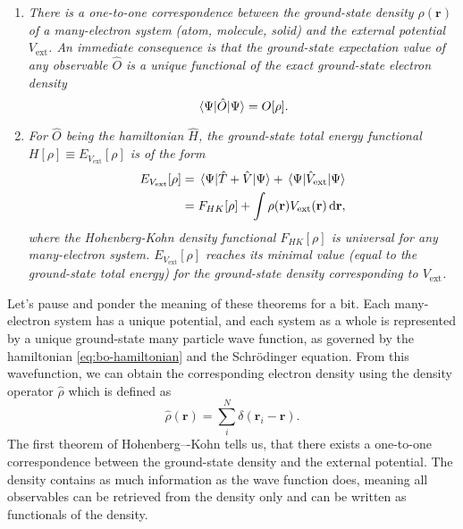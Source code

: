 \begin{enumerate}
  \item \textit{There is a one-to-one correspondence between the ground-state
  density $\rho(\mathbf{r})$ of a many-electron system (atom, molecule, solid)
  and the external potential $V_\mathrm{ext}$. An immediate consequence is
  that the ground-state expectation value of any observable $\hat O$ is a
  unique functional of the exact ground-state electron density}
  \begin{equation}
    \mel{\Psi}{\hat O}{\Psi} = O[\rho].
  \end{equation}

  \item \textit{For $\hat O$ being the hamiltonian $\hat H$, the ground-state
  total energy functional $H[\rho] \equiv E_{V_\mathrm{ext}}[\rho]$ is of the
  form}
  \begin{equation}
  \begin{alignedat}{2}
    E_{V_\mathrm{ext}}[\rho]
    &= \mel{\Psi}{\hat T + \hat V}{\Psi}
    + \mel{\Psi}{\hat V_\mathrm{ext}}{\Psi} \\
    &= F_{HK}[\rho] +
    \int \rho(\mathbf{r}) V_\mathrm{ext}(\mathbf{r}) \, \mathrm{d}\mathbf{r},
    \label{eq:hk-2}
  \end{alignedat}
  \end{equation}
  \textit{where the Hohenberg-Kohn density functional $F_{HK}[\rho]$ is
  universal for any many-electron system. $E_{V_\mathrm{ext}}[\rho]$ reaches its
  minimal value (equal to the ground-state total energy) for the ground-state
  density corresponding to $V_\mathrm{ext}$.}
\end{enumerate}

Let's pause and ponder the meaning of these theorems for a bit. Each
many-electron system has a unique potential, and each system as a whole is
represented by a unique ground-state many particle wave function, as governed
by the hamiltonian \eqref{eq:bo-hamiltonian} and the Schrödinger equation.
From this wavefunction, we can obtain the corresponding electron density using
the density operator $\hat \rho$ which is defined as
\begin{equation}
  \hat \rho(\mathbf{r}) = \sum_i^N \delta(\mathbf{r}_i - \mathbf{r}).
\end{equation}
The first theorem of Hohenberg–-Kohn tells us, that there exists a one-to-one
correspondence between the ground-state density and the external potential.
The density contains as much information as the wave function does, meaning
all observables can be retrieved from the density only and can be written as
functionals of the density.

